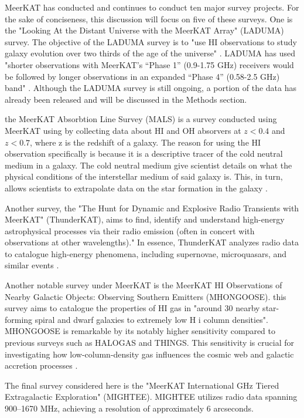 \documentclass[preprint2,linenumbers, longauthor]{aastex631}
\begin{document}
MeerKAT has conducted and continues to conduct ten major survey projects. For the sake of conciseness, this discussion will focus on five of these surveys.
One is the "Looking At the Distant Universe with the MeerKAT Array" (LADUMA) survey.
The objective of the LADUMA survey is to "use HI observations to study galaxy evolution over two thirds of the age of the universe" \cite{blythLADUMALookingDistant2018}. 
LADUMA has used "shorter observations with MeerKAT's “Phase 1” (0.9-1.75 GHz) receivers
would be followed by longer observations in an expanded “Phase 4” (0.58-2.5 GHz) band" \cite{blythLADUMALookingDistant2018}.
Although the LADUMA survey is still ongoing, a portion of the data has already been released and will be discussed in the Methods section.

the MeerKAT Absorbtion Line Survey (MALS) is a survey conducted using MeerKAT using by collecting data about HI and OH absorvers at $z < 0.4$ and $z < 0.7$, where z is the redshift of a galaxy. 
The reason for using the HI observation specifically is because it is a descriptive tracer of the cold neutral medium in a galaxy. 
The cold neutral medium give scientist details on what the physical conditions of the interstellar medium of said galaxy is. This, in turn, allows scientists to extrapolate data on the star formation in the galaxy \cite{guptaBlindOHAbsorption2021}.

Another survey, the "The Hunt for Dynamic and Explosive Radio Transients with MeerKAT" (ThunderKAT), aims to find, identify and understand high-energy astrophysical processes via their radio emission (often in concert with observations at other wavelengths)." 
In essence, ThunderKAT analyzes radio data to catalogue high-energy phenomena, including supernovae, microquasars, and similar events \cite{woudtThunderKATMeerKATLarge2018}.

Another notable survey under MeerKAT is the MeerKAT HI Observations of Nearby Galactic Objects: Observing Southern Emitters (MHONGOOSE). this survey aims to catalogue the properties of HI gas in "around 30 nearby star-forming spiral and dwarf galaxies to extremely low H i column densities". 
MHONGOOSE is remarkable by its notably higher sensitivity compared to previous surveys such as HALOGAS and THINGS. This sensitivity is crucial for investigating how low-column-density gas influences the cosmic web and galactic accretion processes \cite{deblokMHONGOOSEMeerKATNearby2024}.

The final survey considered here is the "MeerKAT International GHz Tiered Extragalactic Exploration" (MIGHTEE). MIGHTEE utilizes radio data spanning 900–1670 MHz, achieving a resolution of approximately 6 arcseconds.
\end{document}
